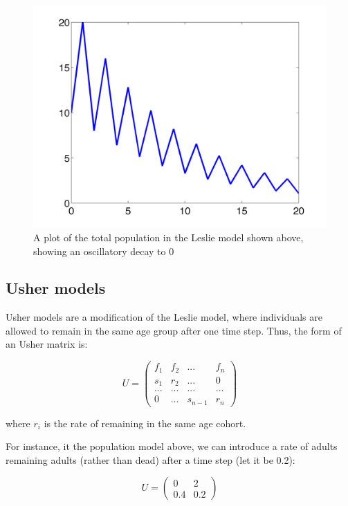 \documentclass[
  letterpaper,
  DIV=11,
  numbers=noendperiod]{scrreprt}
\begin{document}
\begin{figure}

{\centering \includegraphics{./images/leslie_dynamics.png}

}

\caption{A plot of the total population in the Leslie model shown above,
showing an oscillatory decay to 0}

\end{figure}

\hypertarget{usher-models}{%
\subsection{Usher models}\label{usher-models}}

Usher models are a modification of the Leslie model, where individuals
are allowed to remain in the same age group after one time step. Thus,
the form of an Usher matrix is:

\[
U = \left(\begin{array}{cccc}f_1 & f_2 & ... & f_n \\s_1 & r_2 & ... & 0 \\... & ... &...& ... \\0 & ... & s_{n-1} & r_n\end{array}\right)
\]

where \(r_i\) is the rate of remaining in the same age cohort.

For instance, it the population model above, we can introduce a rate of
adults remaining adults (rather than dead) after a time step (let it be
0.2):

\[
U =  \left(\begin{array}{cc}0 & 2 \\0.4 & 0.2\end{array}\right)
\]
\end{document}
